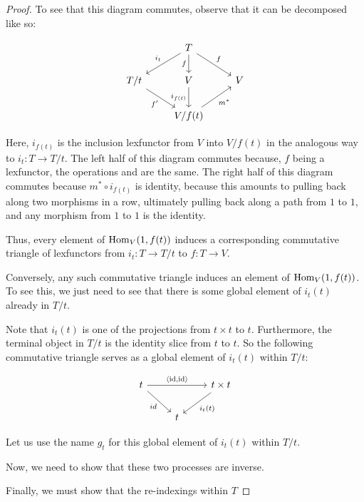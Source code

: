 \begin{proof}
To see that this diagram commutes, observe that it can be decomposed like so:

\[\begin{tikzcd}
	& T \\
	{T/t} & V & V \\
	& {V/f(t)}
	\arrow["{i_t}"', from=1-2, to=2-1]
	\arrow["f", from=1-2, to=2-3]
	\arrow["{f'}"', from=2-1, to=3-2]
	\arrow["{m^*}"', from=3-2, to=2-3]
	\arrow["f"', from=1-2, to=2-2]
	\arrow["{i_{f(t)}}"', from=2-2, to=3-2]
\end{tikzcd}\]

Here, $i_{f(t)}$ is the inclusion lexfunctor from $V$ into $V/f(t)$ in the analogous way to $i_t : T \to T/t$. The left half of this diagram commutes because, $f$ being a lexfunctor, the operations  and  are the same. The right half of this diagram commutes because $m^* \circ i_{f(t)}$ is identity, because this amounts to pulling back along two morphisms in a row, ultimately pulling back along a path from $1$ to $1$, and any morphism from $1$ to $1$ is the identity. 

Thus, every element of $\operatorname{Hom}_V(1, f(t))$ induces a corresponding commutative triangle of lexfunctors from $i_t : T \to T/t$ to $f : T \to V$.

Conversely, any such commutative triangle induces an element of $\operatorname{Hom}_V(1, f(t))$. To see this, we just need to see that there is some global element of $i_t(t)$ already in $T/t$.

Note that $i_t(t)$ is one of the projections from $t \times t$ to $t$. Furthermore, the terminal object in $T/t$ is the identity slice from $t$ to $t$. So the following commutative triangle serves as a global element of $i_t(t)$ within $T/t$:

\[\begin{tikzcd}
	t && {t \times t} \\
	& t
	\arrow["id"', from=1-1, to=2-2]
	\arrow["{i_t(t)}", from=1-3, to=2-2]
	\arrow["{\langle \id, \id \rangle}", from=1-1, to=1-3]
\end{tikzcd}\]

Let us use the name $g_t$ for this global element of $i_t(t)$ within $T/t$.

Now, we need to show that these two processes are inverse. \TODO

Finally, we must show that the re-indexings within $T$ \TODO
\end{proof}


